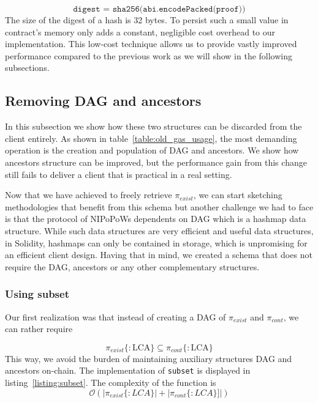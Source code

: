 \[\texttt{digest = sha256(abi.encodePacked(proof))}\] The size of the digest of
a hash is 32 bytes. To persist such a small value in contract's memory only
adds a constant, negligible cost overhead to our implementation. This low-cost
technique allows us to provide vastly improved performance compared to the
previous work as we will show in the following subsections.





\subsection{Removing DAG and ancestors}

In this subsection we show how these two structures can be discarded from the
client entirely. As shown in table~\ref{table:old_gas_usage}, the most
demanding operation is the creation and population of DAG and ancestors. We
show how ancestors structure can be improved, but the performance gain from
this change still fails to deliver a client that is practical in a real
setting.

Now that we have achieved to freely retrieve $\pi_{exist}$, we can start
sketching methodologies that benefit from this schema but another challenge we
had to face is that the protocol of NIPoPoWs dependents on DAG which is a
hashmap data structure. While such data structures are very efficient and
useful data structures, in Solidity, hashmaps can only be contained in storage,
which is unpromising for an efficient client design. Having that in mind, we
created a schema that does not require the DAG, ancestors or any other
complementary structures.


\subsubsection{Using subset}

Our first realization was that instead of creating a DAG of $\pi_{exist}$ and
$\pi_{cont}$, we can rather require

\[ \pi_{exist}\{:\textrm{LCA}\} \subseteq \pi_{cont}\{:\textrm{LCA}\} \]
This way, we avoid the burden of maintaining auxiliary structures DAG and
ancestors on-chain. The implementation of \texttt{subset} is displayed in
listing~\ref{listing:subset}. The complexity of the function is \[
\mathcal{O}(|\pi_{exist}\{:LCA\}| + |\pi_{cont}\{:LCA\}]|) \]

